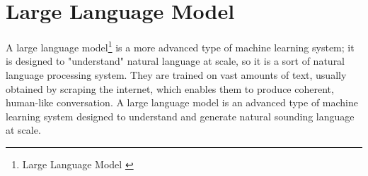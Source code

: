\section{Large Language Model}
A large language model\footnote{Large Language Model \cite{llm}}
is a more advanced type of machine learning system;
it is designed to "understand" natural language at scale,
so it is a sort of natural language processing system.
They are trained on vast amounts of text, usually obtained by scraping the internet,
which enables them to produce coherent, human-like conversation.
A large language model is an advanced type of machine learning system  
designed to understand and generate natural sounding language at scale.
